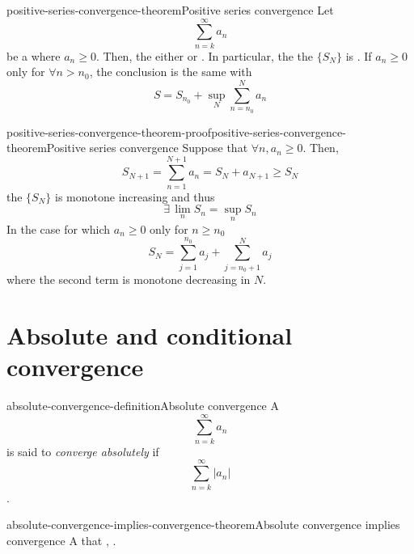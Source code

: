 \documentclass[preview]{standalone}
\begin{document}
\begin{snippettheorem}{positive-series-convergence-theorem}{Positive series convergence}
    Let \[ \sum_{n=k}^\infty a_n \]
    be a \series where \(a_n \geq 0\). Then, the \series either \seriesdiverges
    or \seriesconverges. In particular, the \series \seriesconverges \ifandonlyif the \partialsum
    \sequence \(\{S_N\}\) is .
    If \(a_n \geq 0\) only \eventually for \(\forall n>n_0\),
    the conclusion is the same with
    \[
        S = S_{n_0} + \sup_N
        \sum_{n=n_0}^N a_n
    \]
\end{snippettheorem}


\begin{snippetproof}{positive-series-convergence-theorem-proof}{positive-series-convergence-theorem}{Positive series convergence}
    Suppose that \(\forall n, a_n \geq 0\). Then,
    \[
        S_{N+1} = \sum_{n=1}^{N+1} a_n = S_N + a_{N+1} \geq S_N
    \]
    the \sequence \(\{S_N\}\) is monotone increasing and thus %
    \[ \exists\, \lim_n S_n = \sup_n S_n \]
    In the case for which \(a_n \geq 0\) only for \(n\geq n_0\)
    \[ S_N = \sum_{j=1}^{n_0} a_j + \sum_{j=n_0 + 1}^N a_j \]
    where the second term is monotone decreasing in \(N\).
\end{snippetproof}

\section{Absolute and conditional convergence}

\begin{snippetdefinition}{absolute-convergence-definition}{Absolute convergence}
    A \series \[\sum_{n=k}^\infty a_n\] is said to \emph{converge absolutely} if
    \[\sum_{n=k}^\infty |a_n|\] \seriesconverges.
\end{snippetdefinition}


\begin{snippettheorem}{absolute-convergence-implies-convergence-theorem}{Absolute convergence implies convergence}
    A \series that \convergesabsolutely, \seriesconverges.
\end{snippettheorem}
\end{document}
